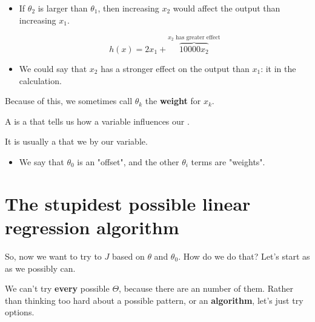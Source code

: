        \begin{itemize}
            \item If $\theta_2$ is larger than $\theta_1$, then increasing $x_2$ would affect the output  than increasing $x_1$.

            \begin{equation}
                h(x) = 2x_1 + \overbrace{10000x_2}^{\text{$x_2$ has greater effect}}
            \end{equation}

            \item We could say that $x_2$ has a stronger effect on the output than $x_1$: it  in the calculation.
        \end{itemize}
        
        
        Because of this, we sometimes call $\theta_k$ the \textbf{weight} for $x_k$.\\
        
        \begin{definition}
            A  is a  that tells us how  a variable influences our .
            
            It is usually a  that we  by our variable.
        \end{definition}

        \begin{itemize}
            \item We say that $\theta_0$ is an "offset", and the other $\theta_i$ terms are "weights".
        \end{itemize}

\pagebreak

\section{The stupidest possible linear regression algorithm}
    
    So, now we want to try to  $J$ based on $\theta$ and $\theta_0$. How do we do that? Let's start as  as we possibly can.

    \phantom{}
    
    We can't try \textbf{every} possible $\Theta$, because there are an  number of them. Rather than thinking too hard about a possible pattern, or an \textbf{algorithm}, let's just  try options.
    
